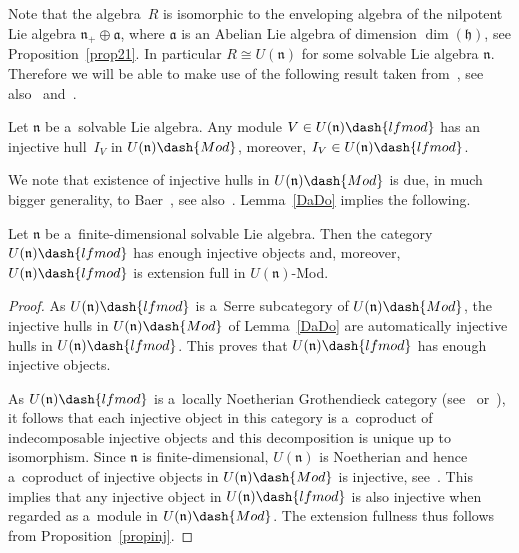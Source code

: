 \documentclass[pdftex]{sigma}
\begin{document}
Note that the algebra~$R$ is isomorphic to the enveloping algebra of the nilpotent Lie algebra $\mathfrak{n}_+\oplus
\mathfrak{a}$, where $\mathfrak{a}$ is an Abelian Lie algebra of dimension $\dim(\mathfrak{h})$, see
Proposition~\ref{prop21}.
In particular $R\cong U(\mathfrak{n})$ for some solvable Lie algebra $\mathfrak{n}$.
Therefore we will be able to make use of the following result taken from~\cite[Proposition~1]{Da}, see also~\cite{Do} and~\cite{Fe}.

\begin{lemma}
\label{DaDo}
Let $\mathfrak{n}$ be a~solvable Lie algebra.
Any module $V\in U(\mathfrak{n})\dash{lfmod}$ has an injective hull~$I_V$ in $U(\mathfrak{n})\dash{Mod}$, moreover,
$I_V\in U(\mathfrak{n})\dash{lfmod}$.
\end{lemma}

We note that existence of injective hulls in $U(\mathfrak{n})\dash{Mod}$ is due, in much bigger generality, to
Baer~\cite{Ba}, see also~\cite{ES}.
Lemma~\ref{DaDo} implies the following.

\begin{proposition}
Let $\mathfrak{n}$ be a~finite-dimensional solvable Lie algebra.
Then the category $U(\mathfrak{n})\dash{lfmod}$ has enough injective objects and, moreover,
$U(\mathfrak{n})\dash{lfmod}$ is extension full in $U(\mathfrak{n})$-{\rm Mod}.
\end{proposition}

\begin{proof}
As $U(\mathfrak{n})\dash{lfmod}$ is a~Serre subcategory of $U(\mathfrak{n})\dash{Mod}$, the injective hulls in
$U(\mathfrak{n})\dash{Mod}$ of Lemma~\ref{DaDo} are automatically injective hulls in $U(\mathfrak{n})\dash{lfmod}$.
This proves that $U(\mathfrak{n})\dash{lfmod}$ has enough injective objects.

As $U(\mathfrak{n})\dash{lfmod}$ is a~locally Noetherian Grothendieck category (see~\cite[Appendix~A]{Kr} or~\cite{Ro}),
it follows that each injective object in this category is a~coproduct of indecomposable injective objects and this
decomposition is unique up to isomorphism.
Since $\mathfrak{n}$ is f\/inite-dimensional, $U(\mathfrak{n})$ is Noetherian and hence a~coproduct of injective objects
in $U(\mathfrak{n})\dash{Mod}$ is injective, see~\cite[Proposition~1.2]{Mt}.
This implies that any injective object in $U(\mathfrak{n})\dash{lfmod}$ is also injective when regarded as a~module in
$U(\mathfrak{n})\dash{Mod}$.
The extension fullness thus follows from Proposition~\ref{propinj}.
\end{proof}
\end{document}
